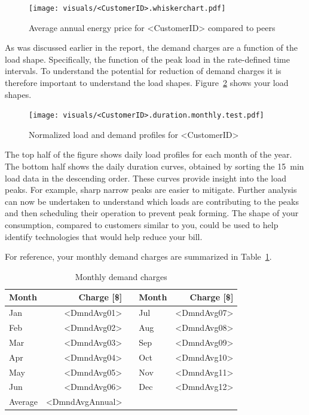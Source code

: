 \documentclass[10pt]{article}
\begin{document}
\begin{figure}[!h]
\centering
\texttt{[image: visuals/<CustomerID>.whiskerchart.pdf]}
\caption{Average annual energy price for <CustomerID> compared to peers}
\label{fig:PeerCompEn}
\end{figure}

\clearpage

\pagestyle{demand}

As was discussed earlier in the report, the demand charges are a function of the load shape.
Specifically, the function of the peak load in the rate-defined time intervals.
To understand the potential for reduction of demand charges it is therefore important to understand the load shapes.
Figure~\ref{fig:duration} shows your load shapes.
\begin{figure}[!h]
\centering
\texttt{[image: visuals/<CustomerID>.duration.monthly.test.pdf]}
\caption{Normalized load and demand profiles for <CustomerID>}
\label{fig:duration}
\end{figure}

The top half of the figure shows daily load profiles for each month of the year.
The bottom half shows the daily duration curves, obtained by sorting the 15~min load data in the descending order.
These curves provide insight into the load peaks.
For example, sharp narrow peaks are easier to mitigate.
Further analysis can now be undertaken to understand which loads are contributing to the peaks and then scheduling their operation to prevent peak forming.
The shape of your consumption, compared to customers similar to you, could be used to help identify technologies that would help reduce your bill.

For reference, your monthly demand charges are summarized in Table~\ref{tab:demand}.

\vfill\eject %

\begin{table}[th!]
  \centering
  \caption{Monthly demand charges}
  \vspace{1.5ex}
  \label{tab:demand}
  \begin{tabular}{p{0.75in}rp{0.2in}p{0.75in}r}
    Month & Charge [\$] & & Month & Charge [\$] \\
    \midrule
    Jan & <DmndAvg01> & & Jul & <DmndAvg07> \\
    Feb & <DmndAvg02> & & Aug & <DmndAvg08> \\
    Mar & <DmndAvg03> & & Sep & <DmndAvg09> \\
    Apr & <DmndAvg04> & & Oct & <DmndAvg10> \\
    May & <DmndAvg05> & & Nov & <DmndAvg11> \\
    Jun & <DmndAvg06> & & Dec & <DmndAvg12> \\
    \midrule
    Average & <DmndAvgAnnual>
  \end{tabular}
\end{table}
\end{document}
